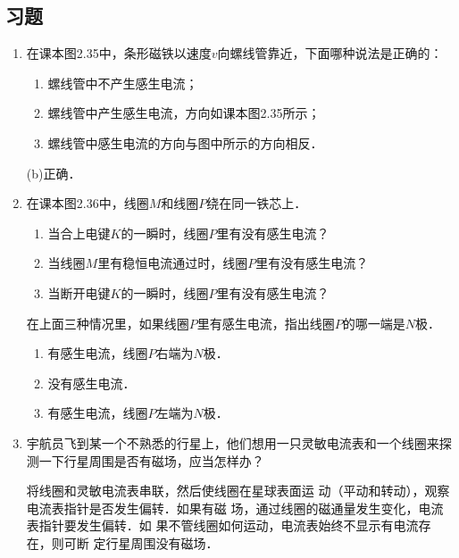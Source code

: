\subsection{习题}
\begin{enumerate}
    \item 在课本图2.35中，条形磁铁以速度$v$向螺线管靠近，下面哪种说法是正确的：


    \begin{enumerate}
\item 螺线管中不产生感生电流；
\item 螺线管中产生感生电流，方向如课本图2.35所示；
\item 螺线管中感生电流的方向与图中所示的方向相反．
    \end{enumerate}
    

\begin{solution}
(b)正确．
\end{solution}

    \item 在课本图2.36中，线圈$M$和线圈$P$绕在同一铁芯上．
    \begin{enumerate}
        \item 当合上电键$K$的一瞬时，线圈$P$里有没有感生电流？
        \item 当线圈$M$里有稳恒电流通过时，线圈$P$里有没有感生电流？
        \item 当断开电键$K$的一瞬时，线圈$P$里有没有感生电流？
    \end{enumerate}
    在上面三种情况里，如果线圈$P$里有感生电流，指出线圈$P$的哪一端是$N$极．

    \begin{solution}
\begin{enumerate}
    \item 有感生电流，线圈$P$右端为$N$极．
    \item 没有感生电流．
    \item 有感生电流，线圈$P$左端为$N$极．
\end{enumerate}
    \end{solution}
   
    \item 宇航员飞到某一个不熟悉的行星上，他们想用一只灵敏电流表和一个线圈来探测一下行星周围是否有磁场，应当怎样办？
   

\begin{solution}
    将线圈和灵敏电流表串联，然后使线圈在星球表面运
    动（平动和转动），观察电流表指针是否发生偏转．如果有磁
    场，通过线圈的磁通量发生变化，电流表指针要发生偏转．如
    果不管线圈如何运动，电流表始终不显示有电流存在，则可断
    定行星周围没有磁场．
\end{solution}


\end{enumerate}
